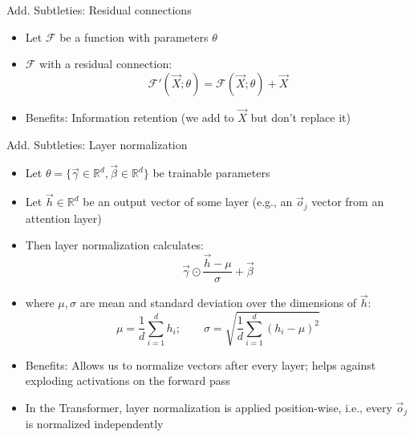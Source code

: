 \documentclass[11pt,compress,t,notes=noshow, xcolor=table]{beamer}
\begin{document}
\begin{vbframe}{Add. Subtleties: Residual connections}

\vfill

\begin{itemize}
\item Let $\mathcal{F}$ be a function with parameters $\theta$
\item $\mathcal{F}$ with a residual connection:
$$\mathcal{F}'(\vec X; \theta) = \mathcal{F}(\vec X; \theta) + \vec X$$
\begin{center}
\vfill
{}
\end{center}
\item Benefits: Information retention (we add to $\vec X$ but don't replace it) 
\end{itemize}

\vfill

\end{vbframe}


\begin{vbframe}{Add. Subtleties: Layer normalization}

\vfill

\begin{itemize}
\item Let $\theta = \{\vec \gamma \in \mathbb{R}^d, \vec \beta \in \mathbb{R}^d\}$ be trainable parameters
\item Let $\vec h \in \mathbb{R}^d$ be an output vector of some layer (e.g., an $\vec o_j$ vector from an attention layer)
\item Then layer normalization calculates:
$$ \vec \gamma \odot \frac{\vec h - \mu}{\sigma} + \vec \beta $$
\item where $\mu, \sigma$ are mean and standard deviation over the dimensions of $\vec h$:
$$ \mu = \frac{1}{d} \sum_{i=1}^d h_{i}; \qquad \sigma = \sqrt{\frac{1}{d} \sum_{i=1}^d (h_i - \mu)^2} $$
\item Benefits: Allows us to normalize vectors after every layer; helps against exploding activations on the forward pass
\item In the Transformer, layer normalization is applied position-wise, i.e., every $\vec o_j$ is normalized independently
\end{itemize}

\vfill

\end{vbframe}
\end{document}
